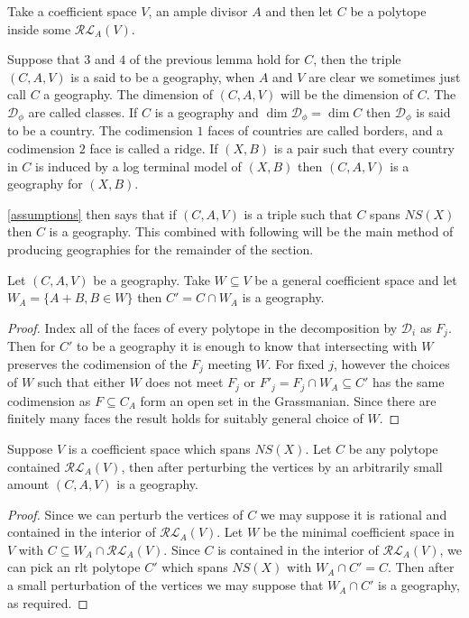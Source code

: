 \documentclass[a4paper,12pt]{amsart}
\begin{document}
	\begin{definition}
		Take a coefficient space $V$, an ample divisor $A$ and then let $C$ be a polytope inside some $\mathcal{RL}_{A}(V)$.
		
		Suppose that $3$ and $4$ of the previous lemma hold for $C$, then the triple $(C,A,V)$ is a said to be a geography, when $A$ and $V$ are clear we sometimes just call $C$ a geography. The dimension of $(C,A,V)$ will be the dimension of $C$.
		The $\mathcal{D}_{\phi}$ are called classes.
		If $C$ is a geography and $\dim \mathcal{D_{\phi}}= \dim C$ then $\mathcal{D}_{\phi}$ is said to be a country. The codimension $1$ faces of countries are called borders, and a codimension $2$ face is called a ridge.
		If $(X,B)$ is a pair such that every country in $C$ is induced by a log terminal model of $(X,B)$ then $(C,A,V)$ is a geography for $(X,B)$.
	\end{definition}

	\autoref{assumptions} then says that if $(C,A,V)$ is a triple such that $C$ spans $NS(X)$ then $C$ is a geography.
	This combined with following will be the main method of producing geographies for the remainder of the section.
	
	\begin{lemma}
		Let $(C,A,V)$ be a geography. Take $W \subseteq V$ be a general coefficient space and let $W_{A}=\{A+B, B \in W\}$ then $C'=C \cap W_{A}$ is a geography. 
	\end{lemma}
	\begin{proof}
		Index all of the faces of every polytope in the decomposition by $\mathcal{D}_{i}$ as $F_{j}$. Then for $C'$ to be a geography it is enough to know that intersecting with $W$ preserves the codimension of the $F_{j}$ meeting $W$. For fixed $j$, however the choices of $W$ such that either $W$ does not meet $F_{j}$ or $F'_{j}=F_{j} \cap W_{A} \subseteq C'$ has the same codimension as $F \subseteq C_{A}$ form an open set in the Grassmanian. Since there are finitely many faces the result holds for suitably general choice of $W$.
	\end{proof}

	
	\begin{lemma}
		Suppose $V$ is a coefficient space which spans $NS(X)$. Let $C$ be any polytope contained $\mathcal{RL}_{A}(V)$, then after perturbing the vertices by an arbitrarily small amount $(C,A,V)$ is a geography.
	\end{lemma}
	\begin{proof}
		Since we can perturb the vertices of $C$ we may suppose it is rational and contained in the interior of $\mathcal{RL}_{A}(V)$. Let $W$ be the minimal coefficient space in $V$ with $C \subseteq W_{A}\cap \mathcal{RL}_{A}(V)$. Since $C$ is contained in the interior of $\mathcal{RL}_{A}(V)$, we can pick an rlt polytope $C'$ which spans $NS(X)$ with $W_{A}\cap C'=C$. Then after a small perturbation of the vertices we may suppose that $W_{A}\cap C'$ is a geography, as required.
	\end{proof}
\end{document}
